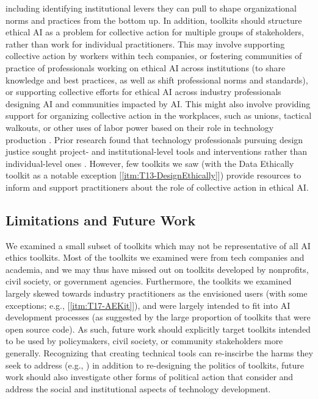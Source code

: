 \documentclass[acmsmall]{acmart}
\begin{document}
including identifying institutional levers they can pull to shape organizational norms and practices from the bottom up. In addition, toolkits should structure ethical AI as a problem for collective action for multiple groups of stakeholders, rather than work for individual practitioners. This may involve supporting collective action by workers within tech companies, or fostering communities of practice of professionals working on ethical AI across institutions (to share knowledge and best practices, as well as shift professional norms and standards), or supporting collective efforts for ethical AI across industry professionals designing AI and communities impacted by AI. This might also involve providing support for organizing collective action in the workplaces, such as unions, tactical walkouts, or other uses of labor power based on their role in technology production \cite{Khovanskaya2019dataRhetoric,wong2021tactics,stark2021critical, Ozoma2021TechWorkerHandbook}. Prior research found that technology professionals pursuing design justice sought project- and institutional-level tools and interventions rather than individual-level ones \cite{Spitzberg2020}. However, few toolkits we saw (with the Data Ethically toolkit as a notable exception [\ref{itm:T13-DesignEthically}]) provide resources to inform and support practitioners about the role of collective action in ethical AI. 



\subsection{Limitations and Future Work}
\label{limitations}

We examined a small subset of toolkits which may not be representative of all AI ethics toolkits. Most of the toolkits we examined were from tech companies and academia, and we may thus have missed out on toolkits developed by nonprofits, civil society, or government agencies. Furthermore, the toolkits we examined largely skewed towards industry practitioners as the envisioned users (with some exceptions; e.g., [\ref{itm:T17-AEKit}]), and were largely intended to fit into AI development processes (as suggested by the large proportion of toolkits that were open source code). As such, future work should explicitly target toolkits intended to be used by policymakers, civil society, or community stakeholders more generally. Recognizing that creating technical tools can re-inscirbe the harms they seek to address (e.g., \cite{green2021datascience,hoffmann2019wherefairness}) in addition to re-designing the politics of toolkits, future work should also investigate other forms of political action that consider and address the social and institutional aspects of technology development. 
\end{document}
